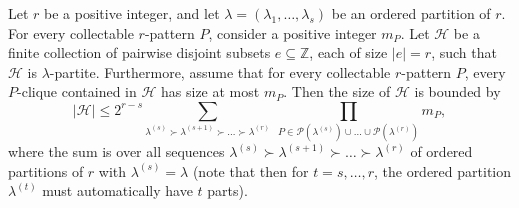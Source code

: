 \documentclass[10pt,a4paper]{amsart}
\newcommand{\HH}{\mathcal{H}}
\newcommand{\PP}{\mathcal{P}}
\newcommand{\Z}{\mathbb{Z}}
\newcommand{\su}{\subseteq}
\begin{document}
\begin{theorem} \label{thm-induction-upper-bound}
Let $r$ be a positive integer, and let $\lambda=(\lambda_1,\dots,\lambda_s)$ be an ordered partition of $r$. For every collectable $r$-pattern $P$, consider a positive integer $m_P$. Let $\HH$ be a finite collection of pairwise disjoint subsets $e\su \Z$, each of size $|e|=r$, such that $\HH$ is $\lambda$-partite. Furthermore, assume that for every collectable $r$-pattern $P$, every $P$-clique contained in $\HH$ has size at most $m_P$. Then the size of $\HH$ is bounded by
\begin{equation}
    |\HH|\le 2^{r-s} \sum_{\lambda^{(s)} \succ \lambda^{(s+1)} \succ \dots \succ \lambda^{(r)}}\ \prod_{ P\in \PP(\lambda^{(s)})\cup\dots\cup \PP(\lambda^{(r)}) } m_{P},
\end{equation}
where the sum is over all sequences $\lambda^{(s)} \succ \lambda^{(s+1)} \succ \dots \succ \lambda^{(r)}$ of ordered partitions of $r$ with $\lambda^{(s)}=\lambda$ (note that then for $t=s,\dots,r$, the ordered partition $\lambda^{(t)}$ must automatically have $t$ parts).
\end{theorem}
\end{document}
